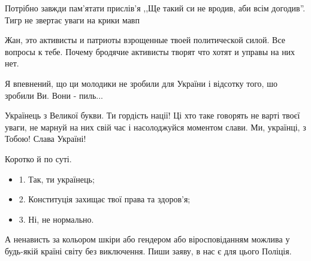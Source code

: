 \begin{itemize}
Потрібно завжди пам'ятати прислів'я ,,Ще такий си не вродив, аби всім догодив''.
Тигр не звертає уваги на крики мавп\Laughey[1.0][white]

 

Жан, это активисты и патриоты взрощенные твоей политической силой. Все вопросы
к тебе. Почему бродячие активисты творят что хотят и управы на них нет.


 

Я впевнений, що ци молодики не зробили для України і відсотку того, шо зробили
Ви. Вони - пиль...


 

Українець з Великої букви. Ти гордість нації! Ці хто таке говорять не варті
твоєї уваги, не марнуй на них свій час і насолоджуйся моментом слави. Ми,
українці, з Тобою! Слава Україні!

 
Коротко й по суті.

\begin{itemize}
  \item 1. Так, ти українець;
  \item 2. Конституція захищає твої права та здоров'я;
  \item 3. Ні, не нормально.
\end{itemize}

А ненависть за кольором шкіри або гендером або віросповіданням можлива у
будь-якій країні світу без виключення. Пиши заяву, в нас є для цього Поліція.


 


\end{itemize}
